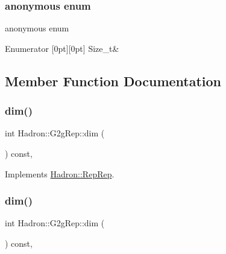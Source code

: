 \subsubsection{\texorpdfstring{anonymous enum}{anonymous enum}}
{\footnotesize\ttfamily anonymous enum}

\begin{DoxyEnumFields}{Enumerator}
[0pt][0pt]{}\mbox{\label{structHadron_1_1G2gRep_adbb02275ba8f6791b9c6ceaecb1f6966a6172534c9e0b8f05437d5abea828fe08}} 
Size\+\_\+t&\\
\hline

\end{DoxyEnumFields}


\subsection{Member Function Documentation}
\mbox{\label{structHadron_1_1G2gRep_a8aa2fce05b77da3aab118ec1e5f16687}} 
\subsubsection{\texorpdfstring{dim()}{dim()}\hspace{0.1cm}{\footnotesize\ttfamily [1/3]}}
{\footnotesize\ttfamily int Hadron\+::\+G2g\+Rep\+::dim (\begin{DoxyParamCaption}{ }\end{DoxyParamCaption}) const\hspace{0.3cm}{\ttfamily [inline]}, {\ttfamily [virtual]}}



Implements \mbox{\hyperlink{structHadron_1_1RepRep_a92c8802e5ed7afd7da43ccfd5b7cd92b}{Hadron\+::\+Rep\+Rep}}.

\mbox{\label{structHadron_1_1G2gRep_a8aa2fce05b77da3aab118ec1e5f16687}} 
\subsubsection{\texorpdfstring{dim()}{dim()}\hspace{0.1cm}{\footnotesize\ttfamily [2/3]}}
{\footnotesize\ttfamily int Hadron\+::\+G2g\+Rep\+::dim (\begin{DoxyParamCaption}{ }\end{DoxyParamCaption}) const\hspace{0.3cm}{\ttfamily [inline]}, {\ttfamily [virtual]}}



